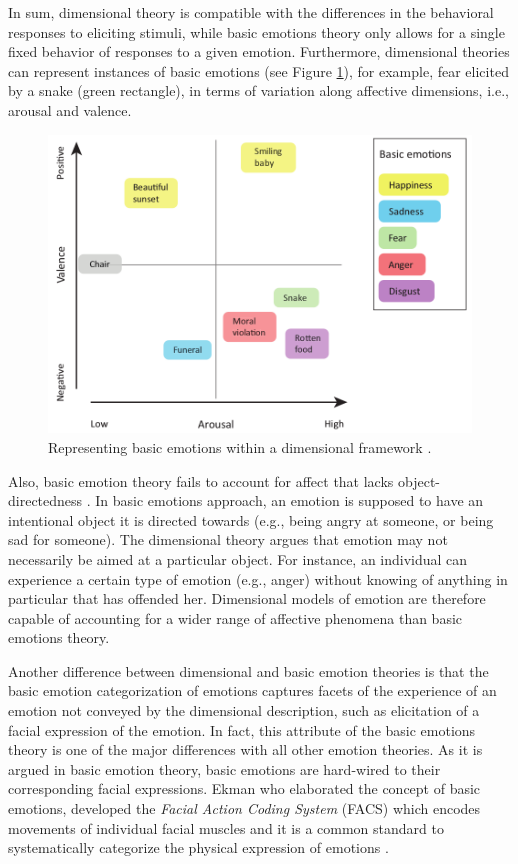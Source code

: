 \documentclass[12pt]{report}
\begin{document}
In sum, dimensional theory is compatible with the differences in the behavioral
responses to eliciting stimuli, while basic emotions theory only allows for a
single fixed behavior of responses to a given emotion. Furthermore, dimensional
theories can represent instances of basic emotions (see Figure
\ref{fig:dimensional-discrete}), for example, fear elicited by a snake (green
rectangle), in terms of variation along affective dimensions, i.e., arousal and
valence.

\begin{figure}[tbh]
  \center
  \includegraphics[width=.9\textwidth]{figure/dimensional-discrete.png}
  \caption{Representing basic emotions within a dimensional framework
  \cite{hamann:mapping-discrete-dimensional}.}
  \label{fig:dimensional-discrete}
\end{figure}

Also, basic emotion theory fails to account for affect that lacks
object-directedness \cite{russell:core-affect}. In basic emotions approach, an
emotion is supposed to have an intentional object it is directed towards (e.g.,
being angry at someone, or being sad for someone). The dimensional theory argues
that emotion may not necessarily be aimed at a particular object. For instance,
an individual can experience a certain type of emotion (e.g., anger) without
knowing of anything in particular that has offended her. Dimensional models of
emotion are therefore capable of accounting for a wider range of affective
phenomena than basic emotions theory.

Another difference between dimensional and basic emotion theories is that the
basic emotion categorization of emotions captures facets of the experience of
an emotion not conveyed by the dimensional description, such as elicitation of a
facial expression of the emotion. In fact, this attribute of the basic
emotions theory is one of the major differences with all other emotion theories.
As it is argued in basic emotion theory, basic emotions are hard-wired to their
corresponding facial expressions. Ekman who elaborated the concept of basic
emotions, developed the \textit{Facial Action Coding System} (FACS) which
encodes movements of individual facial muscles and it is a common standard to
systematically categorize the physical expression of emotions
\cite{ekman:facial-movement}.
\end{document}
